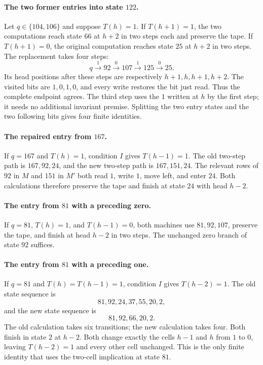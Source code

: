 \paragraph{The two former entries into state $122$.}
Let $q\in\{104,106\}$ and suppose $T(h)=1$.  If $T(h+1)=1$, the two
computations reach state $66$ at $h+2$ in two steps each and preserve the
tape.  If $T(h+1)=0$, the original computation reaches state $25$ at $h+2$
in two steps.  The replacement takes four steps:
\[
 q \xrightarrow{1}92\xrightarrow{0}107
   \xrightarrow{1}125\xrightarrow{0}25.
\]
Its head positions after these steps are respectively
$h+1,h,h+1,h+2$.  The visited bits are $1,0,1,0$, and every write restores
the bit just read.  Thus the complete endpoint agrees.  The third step
uses the $1$ written at $h$ by the first step; it needs no additional
invariant premise.  Splitting the two entry states and the two following
bits gives four finite identities.

\paragraph{The repaired entry from $167$.}
If $q=167$ and $T(h)=1$, condition $I$ gives $T(h-1)=1$.  The old two-step
path is $167,92,24$, and the new two-step path is $167,151,24$.
The relevant rows of $92$ in $M$ and $151$ in $M'$ both read $1$, write
$1$, move left, and enter $24$.  Both calculations therefore preserve
the tape and finish at state $24$ with head $h-2$.

\paragraph{The entry from $81$ with a preceding zero.}
If $q=81$, $T(h)=1$, and $T(h-1)=0$, both machines use
$81,92,107$, preserve the tape, and finish at head $h-2$ in two steps.
The unchanged zero branch of state $92$ suffices.

\paragraph{The entry from $81$ with a preceding one.}
If $q=81$ and $T(h)=T(h-1)=1$, condition $I$ gives $T(h-2)=1$.
The old state sequence is
\[
 81,92,24,37,55,20,2,
\]
and the new state sequence is
\[
 81,92,66,20,2.
\]
The old calculation takes six transitions; the new calculation takes
four.  Both finish in state $2$ at $h-2$.  Both change exactly the cells
$h-1$ and $h$ from $1$ to $0$, leaving $T(h-2)=1$ and every other cell
unchanged.  This is the only finite identity that uses the two-cell
implication at state $81$.

